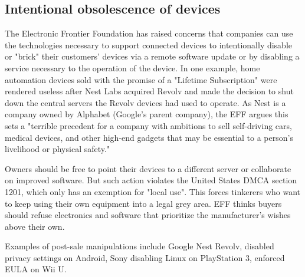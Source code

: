 \documentclass[12pt, a4paper, twoside]{article}
\begin{document}
\subsection{Intentional obsolescence of devices}
The Electronic Frontier Foundation has raised concerns that companies can use the technologies necessary to support connected devices to intentionally disable or "brick" their customers' devices via a remote software update or by disabling a service necessary to the operation of the device. In one example, home automation devices sold with the promise of a "Lifetime Subscription" were rendered useless after Nest Labs acquired Revolv and made the decision to shut down the central servers the Revolv devices had used to operate. As Nest is a company owned by Alphabet (Google's parent company), the EFF argues this sets a "terrible precedent for a company with ambitions to sell self-driving cars, medical devices, and other high-end gadgets that may be essential to a person's livelihood or physical safety."

Owners should be free to point their devices to a different server or collaborate on improved software. But such action violates the United States DMCA section 1201, which only has an exemption for "local use". This forces tinkerers who want to keep using their own equipment into a legal grey area. EFF thinks buyers should refuse electronics and software that prioritize the manufacturer's wishes above their own.

Examples of post-sale manipulations include Google Nest Revolv, disabled privacy settings on Android, Sony disabling Linux on PlayStation 3, enforced EULA on Wii U.
\end{document}
